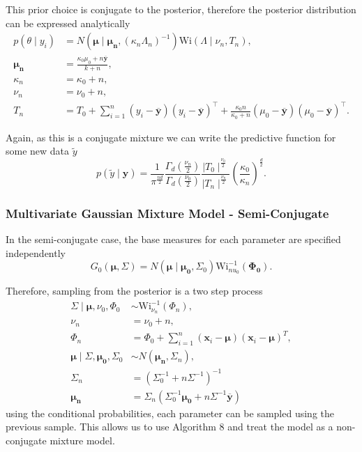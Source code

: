 \documentclass[nojss]{jss}
\begin{document}
This prior choice is conjugate to the posterior, therefore the posterior distribution can be expressed analytically
\begin{align*}
p(\theta \mid y_i ) & = N ( \boldsymbol{\mu} \mid \boldsymbol{\mu _n} , (\kappa _n \Lambda _n )^{-1}  ) \text{Wi} (\Lambda \mid \nu _n, T_n), \\
\boldsymbol{\mu _n} & = \frac{\kappa _0 \mu _0 + n \mathbf{\overline{{y}}}}{k + n}, \\
\kappa _n & = \kappa _0 + n, \\
\nu _n & = \nu _0 + n, \\
T_n & = T_0 + \sum _{i=1} ^n (y_i - \mathbf{\overline{{y}}}) ( y_i -  \mathbf{\overline{{y}}} ) ^\top + \frac{\kappa _0 n}{\kappa _0 + n} ( \mu _0 - \mathbf{\overline{{y}}} )( \mu _0 -  \mathbf{\overline{{y}}} ) ^\top.
\end{align*}

Again, as this is a conjugate mixture we can write the predictive function for some new data $\tilde{y}$
\begin{equation*}
p(\tilde{y} \mid \mathbf{y}  ) = \frac{1}{\pi ^{\frac{nd}{2}}} \frac{\Gamma _d ( \frac{\nu _n}{2})}{\Gamma _d (\frac{\nu _0}{2})}  \frac{\mid T_0 \mid ^ \frac{\nu _0}{2}}{\mid T_n \mid ^ \frac{\nu _n}{2}} \left(  \frac{\kappa _0}{\kappa _n} \right)  ^\frac{d}{2}.
\end{equation*}

\subsubsection{Multivariate Gaussian Mixture Model - Semi-Conjugate}

In the semi-conjugate case, the base measures for each parameter are specified independently
\begin{equation*}
G_0 (\boldsymbol{\mu},  \Sigma) = N(\boldsymbol{\mu} \mid \boldsymbol{\mu _0}, \Sigma _0) \text{Wi}^{-1} _{nu_0} (\boldsymbol{\Phi _0}).
\end{equation*}

Therefore, sampling from the posterior is a two step process
\begin{align*}
\Sigma \mid \boldsymbol{\mu}, \nu _0, \Phi _0 &  \sim \text{Wi} ^{-1} _{\nu_n} (\Phi _n ), \\
\nu _n & = \nu _0 + n, \\
\Phi _n & = \Phi _0 + \sum_{i=1} ^n (\mathbf{x} _i - \boldsymbol{\mu} ) (\mathbf{x} _i - \boldsymbol{\mu} ) ^T, \\
\boldsymbol{\mu} \mid \Sigma , \boldsymbol{\mu _0}, \Sigma _0 & \sim N(\boldsymbol{\mu _n}, \Sigma _n), \\
\Sigma _n & = \left( \Sigma _0 ^{-1} + n \Sigma ^{-1} \right) ^{-1} \\
\boldsymbol{\mu _n} & = \Sigma _n \left( \Sigma _0 ^{-1} \boldsymbol{\mu _0} + n \Sigma ^{-1} \overline{\boldsymbol{y}} \right)
\end{align*}
using the conditional probabilities, each parameter can be sampled using the previous sample. This allows us to use Algorithm 8 and treat the model as a non-conjugate mixture model.
\end{document}
